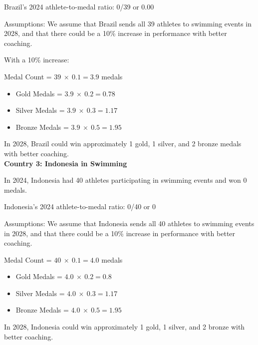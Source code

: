 \documentclass{mcmthesis}
\begin{document}
Brazil's 2024 athlete-to-medal ratio: 0/39 or 0.00

Assumptions: We assume that Brazil sends all 39 athletes to swimming events in 2028, and that there could be a 10\% increase in performance with better coaching. 

With a 10\% increase:

Medal Count = $39\ \times\ 0.1 = 3.9$ medals 

\begin{itemize}
\item Gold Medals = $3.9\ \times\  0.2 = 0.78$ 
\item Silver Medals = $3.9\ \times\  0.3 = 1.17$ 
\item Bronze Medals  = $3.9\ \times\  0.5 = 1.95$ 
\end{itemize}

In 2028, Brazil could win approximately 1 gold, 1 silver, and 2 bronze medals with better coaching. \\

\textbf{Country 3: Indonesia in Swimming}

In 2024, Indonesia had 40 athletes participating in swimming events and won 0 medals. 

Indonesia's 2024 athlete-to-medal ratio: 0/40 or 0

Assumptions: We assume that Indonesia sends all 40 athletes to swimming events in 2028, and that there could be a 10\% increase in performance with better coaching.

Medal Count = $40\ \times\ 0.1 = 4.0$ medals 

\begin{itemize}
\item Gold Medals = $4.0\ \times\  0.2 = 0.8$ 
\item Silver Medals = $4.0\ \times\  0.3 = 1.17$ 
\item Bronze Medals  = $4.0\ \times\  0.5 = 1.95$ 
\end{itemize}

In 2028, Indonesia could win approximately 1 gold, 1 silver, and 2 bronze with better coaching.
\end{document}
